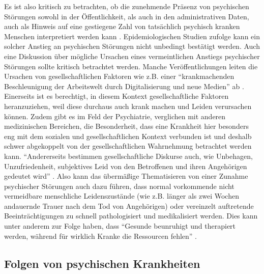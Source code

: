 Es ist also kritisch zu betrachten, ob die zunehmende Präsenz von psychischen Störungen sowohl in der Öffentlichkeit, als auch in den administrativen Daten, auch als Hinweis auf eine gestiegene Zahl von tatsächlich psychisch kranken Menschen interpretiert werden kann \cite[]{wagner2021psychische}. %
Epidemiologischen Studien zufolge kann ein solcher Anstieg an psychischen Störungen nicht unbedingt bestätigt werden. Auch eine Diskussion über mögliche Ursachen eines vermeintlichen Anstiegs psychischer Störungen sollte kritisch betrachtet werden.
Manche Veröffentlichungen leiten die Ursachen von gesellschaftlichen Faktoren wie z.B. einer “krankmachenden Beschleunigung der Arbeitswelt durch Digitalisierung und neue Medien” ab 
\cite[S. 6]{wagner2021psychische}. %
Einerseits ist es berechtigt, in diesem Kontext gesellschaftliche Faktoren heranzuziehen, weil diese durchaus auch krank machen und Leiden verursachen können. Zudem gibt es im Feld der Psychiatrie, verglichen mit anderen medizinischen Bereichen, die Besonderheit, dass eine Krankheit hier besonders eng mit dem sozialen und gesellschaftlichen Kontext verbunden ist und deshalb schwer abgekoppelt von der gesellschaftlichen Wahrnehmung betrachtet werden kann. “Andererseits bestimmen gesellschaftliche Diskurse auch, wie Unbehagen, Unzufriedenheit, subjektives Leid von den Betroffenen und ihren Angehörigen gedeutet wird” \cite[S. 6]{wagner2021psychische}. %
Also kann das übermäßige Thematisieren von einer Zunahme psychischer Störungen auch dazu führen, dass normal vorkommende nicht vermeidbare menschliche Leidenszustände (wie z.B. länger als zwei Wochen andauernde Trauer nach dem Tod von Angehörigen) oder vereinzelt auftretende Beeinträchtigungen zu schnell pathologisiert und medikalisiert werden. Dies kann unter anderem zur Folge haben, dass “Gesunde beunruhigt und therapiert werden, während für wirklich Kranke die Ressourcen fehlen” 
\cite[S. 11]{wagner2021psychische}. %


\subsection{Folgen von psychischen Krankheiten}\label{subsubsec:folgen_psychischer_krankheiten}


